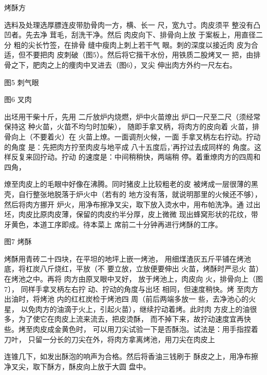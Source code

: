 \begin{recipe}{烤酥方}

\ingredients


\cooking

\step 选料及处理选厚膘连皮带肋骨肉一方，横、长一 尺，宽九寸。肉皮须平
整没有凸凹者。先去净 茸毛，刮洗干净。然后 肉皮向下、排骨向上放
于案板上，用直径二分 粗的尖长竹签，在排骨 缝中瘦肉上刺上若干气
眼。刺的深度以接近肉 皮为合适，但不要把肉
皮刺破（图5）。然后将它揩干水份，用铁质二股烤叉一
把，由排骨之下，肥肉之上的痩肉中叉进去（图6），叉尖 伸出肉方外约一尺左右。

图5 刺气眼

图6 叉肉

\step 出坯用干柴十斤，先用 二斤放炉内烧燃，炉中火苗燎出
炉口一尺至二尺（须经常保持这 种火苗，火苗不均匀时加柴），
随即手拿叉柄，将肉方的皮向着 火苗，排骨向上（不要着火）在
火苗上燎。一面调剂火候，一面 手拿叉柄左右拧动。拧动的角度
是：先把肉方拧至肉皮与地平成 八十五度后，'再拧过去成同样的
角度。这样反复来回拧动。拧动 的速度是：中间稍稍快，两端稍
停。着重燎肉方的四周和四角，

燎至肉皮上的毛眼中好像在沸腾。同时猪皮上比较粗老的皮
被烤成一层很薄的黑壳，自行整张地脱落于炉火中（若有的
地方没有落，就说明那里的火候还不够），然后将肉方挪开
炉火，用净布擦净叉尖，取下放入烫水中，用布帕洗净。通
过出坯，肉皮比原肉皮薄，保留的肉皮约半分厚，皮上微微
现出蜂窝形状的花纹，带牙黄色，本道工序即成。待本菜上
席前二十分钟再进行烤酥的工序。

图7 烤酥

\step 烤酥用青砖二十四块，在平坦的地坪上嵌一烤池，
用细煤渣灰五斤平铺在烤池底，将杠炭八斤烧红，平放（不
要立放，立放便要伸出 火苗，烤酥时严忌火 苗）在烤池之中。再将
肉方由原叉眼中叉好， 放于烤池上，肉皮向 火，排骨向上（图7〕，
同样手拿叉柄左右拧 动、拧动的角度与出坯 相同，但速度稍快。烤
至肉方出油时，将烤池 内的红杠炭检于烤池四 周（前后两端多放一
些，去净池心的火星， 以免肉方的油滴于火上，引起火苗），继续拧动着烤。此时肉
方皮上的油很多，为了使它在肉皮上流来流去，把皮烫酥，
而不掉下来，故拧动速度宜再快些。烤至肉皮成金黄色时，
可以用刀尖试验一下是否酥泡。试法是：用手指捏着刀叶，
只留一分长的刀尖在外，将肉方拿离烤池，用刀尖在肉皮上

连锥几下，如发出酥泡的响声为合格。然后将香油三钱刷于
酥皮之上，用净布擦净叉尖，取下酥方，酥皮向上放于大圆 盘中。


\end{recipe}
